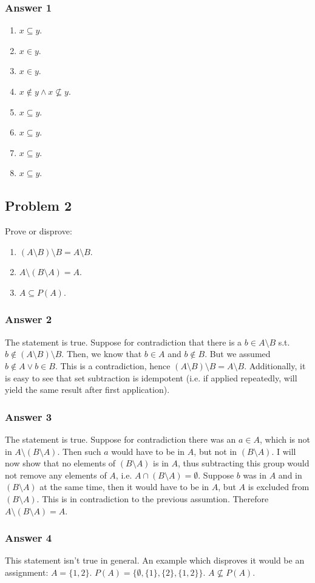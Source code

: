 \documentclass[11pt]{article}
\begin{document}
\subsubsection{Answer 1}
\label{sec-1-1-1}
\begin{enumerate}
\item $x \subseteq y$.
\item $x \in y$.
\item $x \in y$.
\item $x \not \in y \land x \not \subseteq y$.
\item $x \subseteq y$.
\item $x \subseteq y$.
\item $x \subseteq y$.
\item $x \subseteq y$.
\end{enumerate}
\subsection{Problem 2}
\label{sec-1-2}
Prove or disprove:
\begin{enumerate}
\item $(A \setminus B) \setminus B = A \setminus B$.
\item $A \setminus (B \setminus A) = A$.
\item $A \subseteq P(A)$.
\end{enumerate}

\subsubsection{Answer 2}
\label{sec-1-2-1}
The statement is true.  Suppose for contradiction that there is a $b \in A
    \setminus B$ s.t. $b \not \in (A \setminus B) \setminus B$.  Then, we know
that $b \in A$ and $b \not \in B$.  But we assumed $b \not \in A \lor b \in
    B$.  This is a contradiction, hence $(A \setminus B) \setminus B = A
    \setminus B$.  Additionally, it is easy to see that set subtraction is
idempotent (i.e. if applied repeatedly, will yield the same result after
first application).
\subsubsection{Answer 3}
\label{sec-1-2-2}
The statement is true.  Suppose for contradiction there was an $a \in A$,
which is not in $A \setminus (B \setminus A)$.  Then such $a$ would have
to be in $A$, but not in $(B \setminus A)$.  I will now show that no elements
of $(B \setminus A)$ is in $A$, thus subtracting this group would not
remove any elements of $A$, i.e. $A \cap (B \setminus A) = \emptyset$.
Suppose $b$ was in $A$ and in $(B \setminus A)$ at the same time, then
it would have to be in $A$, but $A$ is excluded from $(B \setminus A)$.
This is in contradiction to the previous assumtion.  Therefore
$A \setminus (B \setminus A) = A$.
\subsubsection{Answer 4}
\label{sec-1-2-3}
This statement isn't true in general.  An example which disproves it would
be an assignment: $A=\{1, 2\}$.  $P(A)=\{\emptyset, \{1\}, \{2\}, \{1, 2\}\}$.
$A \not \subseteq P(A)$.
\end{document}
